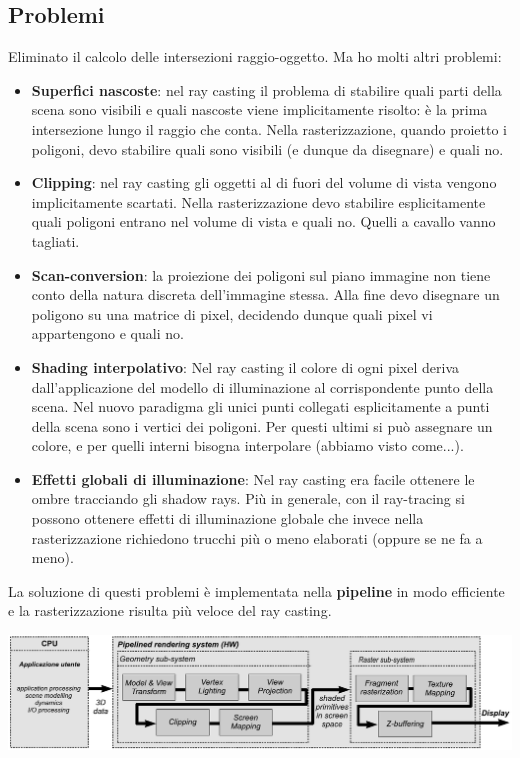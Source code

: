 \documentclass[a4paper, 10pt]{article}
\begin{document}
	\subsection{Problemi}
		Eliminato il calcolo delle intersezioni raggio-oggetto. Ma ho
		molti altri problemi:
		\begin{itemize}
			\item \textbf{Superfici nascoste}: nel ray casting il problema di stabilire quali parti
			della scena sono visibili e quali nascoste viene implicitamente
			risolto: è la prima intersezione lungo il raggio che conta. Nella
			rasterizzazione, quando proietto i poligoni, devo stabilire quali sono
			visibili (e dunque da disegnare) e quali no.
			\item \textbf{Clipping}: nel ray casting gli oggetti al di fuori del volume di vista
			vengono implicitamente scartati. Nella rasterizzazione devo stabilire
			esplicitamente quali poligoni entrano nel volume di vista e quali no.
			Quelli a cavallo vanno tagliati.
			\item \textbf{Scan-conversion}: la proiezione dei poligoni sul piano immagine non
			tiene conto della natura discreta dell’immagine stessa. Alla fine devo
			disegnare un poligono su una matrice di pixel, decidendo dunque
			quali pixel vi appartengono e quali no.
			\item \textbf{Shading interpolativo}: Nel ray casting il colore di ogni pixel deriva
			dall’applicazione del modello di illuminazione al corrispondente
			punto della scena. Nel nuovo paradigma gli unici punti collegati
			esplicitamente a punti della scena sono i vertici dei poligoni. Per
			questi ultimi si può assegnare un colore, e per quelli interni bisogna
			interpolare (abbiamo visto come...).
			\item \textbf{Effetti globali di illuminazione}: Nel ray casting era facile ottenere le
			ombre tracciando gli shadow rays. Più in generale, con il ray-tracing
			si possono ottenere effetti di illuminazione globale che invece nella
			rasterizzazione richiedono trucchi più o meno elaborati (oppure se
			ne fa a meno).
		\end{itemize}
		La soluzione di questi problemi è implementata nella \textbf{pipeline} in modo efficiente e la rasterizzazione risulta più veloce del ray casting.
		
		\bigskip
		
		\begin{center}
			\includegraphics[scale=0.3]{pipeline}
		\end{center}
		
\end{document}
